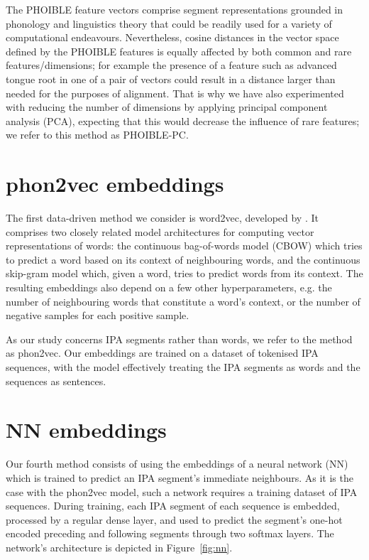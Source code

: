 \documentclass[a4paper]{report}
\begin{document}
The PHOIBLE feature vectors comprise segment representations grounded in phonology and linguistics theory
that could be readily used for a variety of computational endeavours.
Nevertheless, cosine distances in the vector space defined by the PHOIBLE features is equally affected by both common and rare features/dimensions;
for example the presence of a feature such as advanced tongue root in one of a pair of vectors
could result in a distance larger than needed for the purposes of alignment.
That is why we have also experimented with reducing the number of dimensions by applying principal component analysis (PCA),
expecting that this would decrease the influence of rare features; we refer to this method as PHOIBLE-PC.


\section{phon2vec embeddings}

The first data-driven method we consider is word2vec, developed by \citet{2013_Mikolov_al}.
It comprises two closely related model architectures for computing vector representations of words:
the continuous bag-of-words model (CBOW) which tries to predict a word based on its context of neighbouring words,
and the continuous skip-gram model which, given a word, tries to predict words from its context.
The resulting embeddings also depend on a few other hyperparameters,
e.g. the number of neighbouring words that constitute a word's context, or the number of negative samples for each positive sample.

As our study concerns IPA segments rather than words, we refer to the method as phon2vec.
Our embeddings are trained on a dataset of tokenised IPA sequences,
with the model effectively treating the IPA segments as words and the sequences as sentences.


\section{NN embeddings}

Our fourth method consists of using the embeddings of a neural network (NN) which is trained to predict an IPA segment's immediate neighbours.
As it is the case with the phon2vec model, such a network requires a training dataset of IPA sequences.
During training, each IPA segment of each sequence is embedded, processed by a regular dense layer,
and used to predict the segment's one-hot encoded preceding and following segments through two softmax layers.
The network's architecture is depicted in Figure~\ref{fig:nn}.
\end{document}
